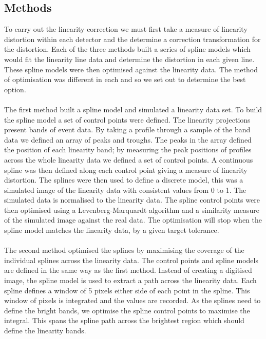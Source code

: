 \subsection{Methods}
To carry out the linearity correction we must first take a measure of linearity distortion within each detector and the determine a correction transformation for the distortion. Each of the three methods built a series of spline models which would fit the linearity line data and determine the distortion in each given line. These spline models were then optimised against the linearity data. The method of optimisation was different in each and so we set out to determine the best option. 
\paragraph{}
The first method built a spline model and simulated a linearity data set. To build the spline model a set of control points were defined. The linearity projections present bands of event data. By taking a profile through a sample of the band data  we defined an array of peaks and troughs. The peaks in the array defined the position of each linearity band; by measuring the peak positions of profiles across the whole linearity data we defined a set of control points. A continuous spline was then defined along each control point giving a measure of linearity distortion. The splines were then used to define a discrete model, this was a simulated image of the linearity data with consistent values from 0 to 1. The simulated data is normalised to the linearity data. The spline control points were then optimised using a Levenberg-Marquardt algorithm and a similarity measure of the simulated image against the real data. The optimisation will stop when the spline model matches the linearity data, by a given target tolerance. 
\paragraph{}
The second method optimised the splines by maximising the coverage of the individual splines across the linearity data. The control points and spline models are defined in the same way as the first method. Instead of creating a digitised image, the spline model is used to extract a path across the linearity data. Each spline defines a window of 5 pixels either side of each point in the spline. This window of pixels is integrated and the values are recorded. As the splines need to define the bright bands, we optimise the spline control points to maximise the integral. This spans the spline path across the brightest region which should define the linearity bands. 
